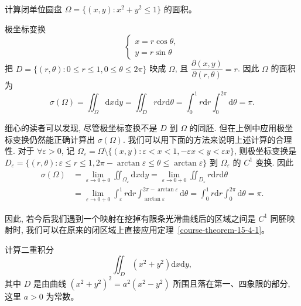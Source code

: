 \documentclass[UTF8,12pt,a4paper,fontset=fandol]{ctexart}
\begin{document}
\begin{example}\label{course-example-15-4-1}\quad 计算闭单位圆盘 $\Omega=\{(x,y):x^2+y^2\leqslant1\}$ 的面积。

\end{example}
\begin{solve}\quad 极坐标变换
\[
  \begin{cases}
    x=r\cos\theta,\\
    y=r\sin\theta
  \end{cases}
\]
把 $D=\{(r,\theta):0\leqslant r\leqslant1,0\leqslant\theta\leqslant2\pi\}$ 映成 $\Omega$, 且 $\dfrac{\partial(x,y)}{\partial(r,\theta)}=r$. 因此 $\Omega$ 的面积为
\[
  \sigma(\Omega)=\iint_\Omega\mathrm dx\mathrm dy
  =\iint_D r\mathrm dr\mathrm d\theta
  =\int_0^1 r\mathrm dr\int_0^{2\pi}\mathrm d\theta=\pi.
\]

细心的读者可以发现, 尽管极坐标变换不是 $D$ 到 $\Omega$ 的同胚. 但在上例中应用极坐标变换仍然能正确计算出 $\sigma(\Omega)$. 我们可以用下面的方法来说明上述计算的合理性. 对于 $\forall\varepsilon>0$, 记 $\Omega_\varepsilon=\Omega\setminus\{(x,y):\varepsilon<x<1,-\varepsilon x<y<\varepsilon x\}$, 则极坐标变换是 $D_\varepsilon=\{(r,\theta):\varepsilon\leqslant r\leqslant1,2\pi-\arctan\varepsilon\leqslant\theta\leqslant\arctan\varepsilon\}$ 到 $\Omega_\varepsilon$ 的 $C^1$ 变换. 因此
\[
\begin{aligned}
  \sigma(\Omega)
  &=\lim_{\varepsilon\to0+0}\iint_{\Omega_\varepsilon}\mathrm dx\mathrm dy
  =\lim_{\varepsilon\to0+0}\iint_{D_\varepsilon}r\mathrm dr\mathrm d\theta\\
  &=\lim_{\varepsilon\to0+0}\int_\varepsilon^1 r\mathrm dr
  \int_{\arctan\varepsilon}^{2\pi-\arctan\varepsilon}\mathrm d\theta
  =\int_0^1 r\mathrm dr\int_0^{2\pi}\mathrm d\theta=\pi.
\end{aligned}
\]

因此, 若今后我们遇到一个映射在挖掉有限条光滑曲线后的区域之间是 $C^1$ 同胚映射时, 我们可以在原来的闭区域上直接应用定理~\ref{course-theorem-15-4-1}。

\end{solve}
\begin{example}\label{course-example-15-4-2}\quad 计算二重积分
\[
  \iint_D(x^2+y^2)\mathrm dx\mathrm dy,
\]
其中 $D$ 是由曲线 $(x^2+y^2)^2=a^2(x^2-y^2)$ 所围且落在第一、四象限的部分, 这里 $a>0$ 为常数。

\end{example}
\end{document}
